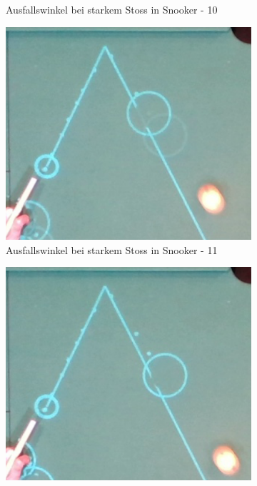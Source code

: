 \begin{figure}[h!]
\begin{subfigure}[b]{0.2\textwidth}
        \caption{Ausfallswinkel bei starkem Stoss in Snooker - 10}
        \label{fig:rebound_angle_fast_snooker_10}
    \end{subfigure}
    \hfill
    \begin{subfigure}[b]{0.2\textwidth}
        \centering
        \includegraphics[width=1.0\linewidth]{../common/04_results/resources/simulation/rebound_angle_fast_snooker/00_rail_rebound_angle_fast_snooker_11.png}
        \caption{Ausfallswinkel bei starkem Stoss in Snooker - 11}
        \label{fig:rebound_angle_fast_snooker_11}
    \end{subfigure}
    \hfill
    \begin{subfigure}[b]{0.2\textwidth}
        \centering
        \includegraphics[width=1.0\linewidth]{../common/04_results/resources/simulation/rebound_angle_fast_snooker/00_rail_rebound_angle_fast_snooker_12.png}

\end{subfigure}
\end{figure}
